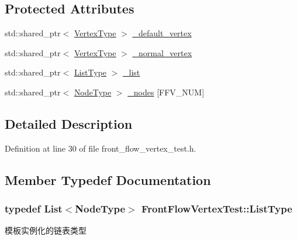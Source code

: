 \subsection*{Protected Attributes}
\begin{DoxyCompactItemize}
\item 
std\+::shared\+\_\+ptr$<$ \hyperlink{class_front_flow_vertex_test_a0eefc91d4672952fe46aafe55b41d195}{Vertex\+Type} $>$ \hyperlink{class_front_flow_vertex_test_a457ca07d1faf2d24e8bf7ab0116e822f}{\+\_\+default\+\_\+vertex}
\item 
std\+::shared\+\_\+ptr$<$ \hyperlink{class_front_flow_vertex_test_a0eefc91d4672952fe46aafe55b41d195}{Vertex\+Type} $>$ \hyperlink{class_front_flow_vertex_test_a5f8a63b2d218d2e733e27ca598e9b864}{\+\_\+normal\+\_\+vertex}
\item 
std\+::shared\+\_\+ptr$<$ \hyperlink{class_front_flow_vertex_test_ac30f272d98796ffce519f894f111fcaa}{List\+Type} $>$ \hyperlink{class_front_flow_vertex_test_a646ef544a16221c204d71d777c76b17b}{\+\_\+list}
\item 
std\+::shared\+\_\+ptr$<$ \hyperlink{class_front_flow_vertex_test_a80f3e381f6911872f7a4359ceff966bf}{Node\+Type} $>$ \hyperlink{class_front_flow_vertex_test_a87ecf1ffdaa2b7c78ba360b2deb4cfd1}{\+\_\+nodes} \mbox{[}F\+F\+V\+\_\+\+N\+U\+M\mbox{]}
\end{DoxyCompactItemize}


\subsection{Detailed Description}


Definition at line 30 of file front\+\_\+flow\+\_\+vertex\+\_\+test.\+h.



\subsection{Member Typedef Documentation}
\hypertarget{class_front_flow_vertex_test_ac30f272d98796ffce519f894f111fcaa}{}
\subsubsection[{List\+Type}]{\setlength{\rightskip}{0pt plus 5cm}typedef {\bf List}$<${\bf Node\+Type}$>$ {\bf Front\+Flow\+Vertex\+Test\+::\+List\+Type}}\label{class_front_flow_vertex_test_ac30f272d98796ffce519f894f111fcaa}
模板实例化的链表类型 

